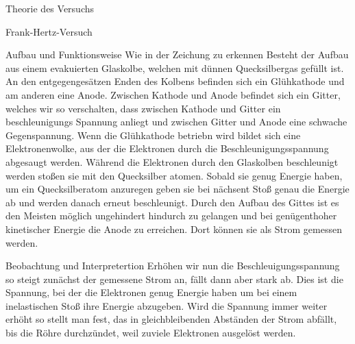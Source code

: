\documentclass[pdftex, a4paper,11pt, twoside, ngerman]{report}
\begin{document}
\begin{chapter}{Theorie des Versuchs}
\begin{section}{Frank-Hertz-Versuch}
      \begin{subsection}{Aufbau und Funktionsweise}
        Wie in der Zeichung zu erkennen Besteht der Aufbau aus einem
        evakuierten Glaskolbe, welchen mit dünnen Quecksilbergas gefüllt ist. 
        An den entgegengesätzen Enden des Kolbens befinden sich ein
        Glühkathode und am anderen eine Anode. Zwischen Kathode und Anode
        befindet sich ein Gitter, welches wir so verschalten, dass zwischen
        Kathode und Gitter ein beschleunigungs Spannung anliegt und zwischen
        Gitter und Anode eine schwache Gegenspannung. Wenn die Glühkathode
        betriebn wird bildet sich eine Elektronenwolke, aus der die Elektronen
        durch die Beschleunigungsspannung abgesaugt werden. Während die
        Elektronen durch den Glaskolben beschleunigt werden stoßen sie mit den
        Quecksilber atomen. Sobald sie genug Energie haben, um ein
        Quecksilberatom anzuregen geben sie bei nächsent Stoß genau die Energie
        ab und werden danach erneut beschleunigt. Durch den Aufbau des Gittes
        ist es den Meisten möglich ungehindert hindurch zu gelangen und bei
        genügenthoher kinetischer Energie die Anode zu erreichen. Dort können
        sie als Strom gemessen werden.
          

      \end{subsection}
      
      
      
      \begin{subsection}{Beobachtung und Interpretertion}
        Erhöhen wir nun die Beschleuigungsspannung so steigt zunächst der
        gemessene Strom an, fällt dann aber stark ab. Dies ist die Spannung,
        bei der die Elektronen genug Energie haben um bei einem inelastischen
        Stoß ihre Energie abzugeben. Wird die Spannung immer weiter erhöht so
        stellt man fest, das in gleichbleibenden Abständen der Strom abfällt,
        bis die Röhre durchzündet, weil zuviele Elektronen ausgelöst werden. 


\end{subsection}
\end{section}
\end{chapter}
\end{document}
